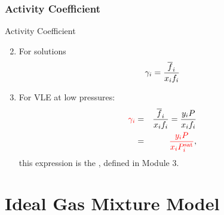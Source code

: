 \documentclass[10pt,compress,handout,ignorenonframetext,unknownkeysallowed]{beamer}
\begin{document}
\begin{frame}
  \frametitle{Activity Coefficient}
       \begin{block}{\begin{center}\normalsize{ Activity Coefficient}\end{center}}
            \begin{enumerate}\setcounter{enumi}{1}  
               \item<1-> For solutions
                  \begin{displaymath}
                     \gamma_{i} = \displaystyle\frac{\overline{f}_{i}}{x_{i}f_{i}}
                  \end{displaymath}
               \item<2-> For VLE at low pressures:
                  \begin{eqnarray}
                      \textcolor{red}{\gamma_{i}} &=& \displaystyle\frac{\overline{f}_{i}}{x_{i}f_{i}} = \displaystyle\frac{y_{i}P}{x_{i}f_{i}} \nonumber \\
                                        &=&  \textcolor{red}{\displaystyle\frac{y_{i}P}{x_{i}P_{i}^{\text{sat}}}}, \nonumber
                  \end{eqnarray}
                  this expression is the , defined in Module 3.
             \end{enumerate}
        \end{block}
         
\end{frame}
\normalsize

\section{Ideal Gas Mixture Model}
\end{document}
